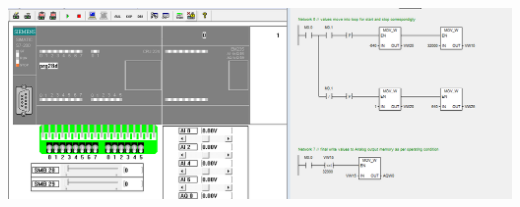 \documentclass[
	12pt, %
]{fphw}
\begin{document}
\begin{enumerate}
\begin{center}
      \includegraphics[width = 165mm, scale = 0.9]{prg28d3.png}
    \end{center}
\end{enumerate}
\end{document}
